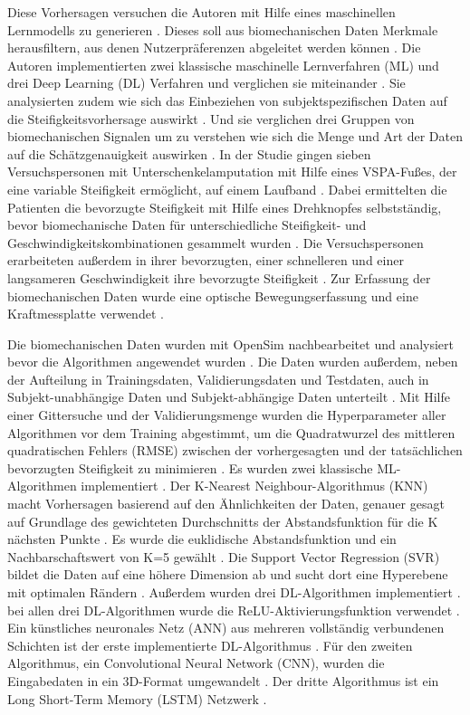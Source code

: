 Diese Vorhersagen versuchen die Autoren mit Hilfe eines maschinellen Lernmodells zu generieren \cite{Shetty.2022}. Dieses soll aus biomechanischen Daten Merkmale herausfiltern, aus denen Nutzerpräferenzen abgeleitet werden können \cite{Shetty.2022}. 
Die Autoren implementierten zwei klassische maschinelle Lernverfahren (ML) und drei Deep Learning (DL) Verfahren und verglichen sie miteinander \cite{Shetty.2022}. 
Sie analysierten zudem wie sich das Einbeziehen von subjektspezifischen Daten auf die Steifigkeitsvorhersage auswirkt \cite{Shetty.2022}. Und sie verglichen drei Gruppen von biomechanischen Signalen um zu verstehen wie sich die Menge und Art der Daten auf die Schätzgenauigkeit auswirken \cite{Shetty.2022}. 
In der Studie gingen sieben Versuchspersonen mit Unterschenkelamputation mit Hilfe eines VSPA-Fußes, der eine variable Steifigkeit ermöglicht, auf einem Laufband \cite{Shetty.2022}. Dabei ermittelten die Patienten die bevorzugte Steifigkeit mit Hilfe eines Drehknopfes selbstständig, bevor biomechanische Daten für unterschiedliche Steifigkeit- und Geschwindigkeitskombinationen gesammelt wurden \cite{Shetty.2022}. Die Versuchspersonen erarbeiteten außerdem in ihrer bevorzugten, einer schnelleren und einer langsameren Geschwindigkeit ihre bevorzugte Steifigkeit \cite{Shetty.2022}. Zur Erfassung der biomechanischen Daten wurde eine optische Bewegungserfassung und eine Kraftmessplatte verwendet \cite{Shetty.2022}.

Die biomechanischen Daten wurden mit OpenSim nachbearbeitet und analysiert bevor die Algorithmen angewendet wurden \cite{Shetty.2022}. Die Daten wurden außerdem, neben der Aufteilung in Trainingsdaten, Validierungsdaten und Testdaten, auch in Subjekt-unabhängige Daten und Subjekt-abhängige Daten unterteilt \cite{Shetty.2022}. Mit Hilfe einer Gittersuche und der Validierungsmenge wurden die Hyperparameter aller Algorithmen vor dem Training abgestimmt, um die Quadratwurzel des mittleren quadratischen Fehlers (RMSE) zwischen der vorhergesagten und der tatsächlichen bevorzugten Steifigkeit zu minimieren \cite{Shetty.2022}.
Es wurden zwei klassische ML-Algorithmen implementiert \cite{Shetty.2022}. Der K-Nearest Neighbour-Algorithmus (KNN) macht Vorhersagen basierend auf den Ähnlichkeiten der Daten, genauer gesagt auf Grundlage des gewichteten Durchschnitts der Abstandsfunktion für die K nächsten Punkte \cite{Shetty.2022}. Es wurde die euklidische Abstandsfunktion und ein Nachbarschaftswert von K=5 gewählt \cite{Shetty.2022}. Die Support Vector Regression (SVR) bildet die Daten auf eine höhere Dimension ab und sucht dort eine Hyperebene mit optimalen Rändern \cite{Shetty.2022}. Außerdem wurden drei DL-Algorithmen implementiert \cite{Shetty.2022}. bei allen drei DL-Algorithmen wurde die ReLU-Aktivierungsfunktion verwendet \cite{Shetty.2022}. Ein künstliches neuronales Netz (ANN) aus mehreren vollständig verbundenen Schichten ist der erste implementierte DL-Algorithmus \cite{Shetty.2022}. Für den zweiten Algorithmus, ein Convolutional Neural Network (CNN), wurden die Eingabedaten in ein 3D-Format umgewandelt \cite{Shetty.2022}. Der dritte Algorithmus ist ein Long Short-Term Memory (LSTM) Netzwerk \cite{Shetty.2022}. 

